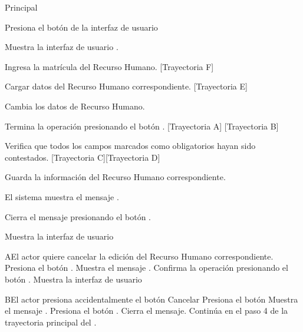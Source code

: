 \begin{UCtrayectoria}{Principal}

    \UCpaso[\UCactor] Presiona el botón  de la interfaz de usuario 

    \UCpaso Muestra la interfaz de usuario .

	\UCpaso Ingresa la matrícula del Recurso Humano. [Trayectoria F]

    \UCpaso Cargar datos del Recurso Humano correspondiente. [Trayectoria E]

    \UCpaso[\UCactor] Cambia los datos de Recurso Humano.

    \UCpaso[\UCactor] Termina la operación presionando el botón . [Trayectoria A] [Trayectoria B]

    \UCpaso Verifica que todos los campos marcados como obligatorios hayan sido contestados. [Trayectoria C][Trayectoria D]

    \UCpaso Guarda la información del Recurso Humano correspondiente.

    \UCpaso El sistema muestra el mensaje .

    \UCpaso[\UCactor] Cierra el mensaje presionando el botón .

    \UCpaso Muestra la interfaz de usuario 
\end{UCtrayectoria}




\begin{UCtrayectoriaA}{A}{El actor quiere cancelar la edición  del Recurso Humano correspondiente.}
	\UCpaso[\UCactor] Presiona el botón .
    \UCpaso Muestra el mensaje .
    \UCpaso[\UCactor] Confirma la operación presionando el botón .
    \UCpaso Muestra la interfaz de usuario 
\end{UCtrayectoriaA}



\begin{UCtrayectoriaA}{B}{El actor presiona accidentalmente el botón Cancelar}
	\UCpaso[\UCactor] Presiona el botón 
    \UCpaso Muestra el mensaje .
    \UCpaso[\UCactor] Presiona el botón .
    \UCpaso Cierra el mensaje.
    \UCpaso Continúa en el paso 4 de la trayectoria principal del .
\end{UCtrayectoriaA}

